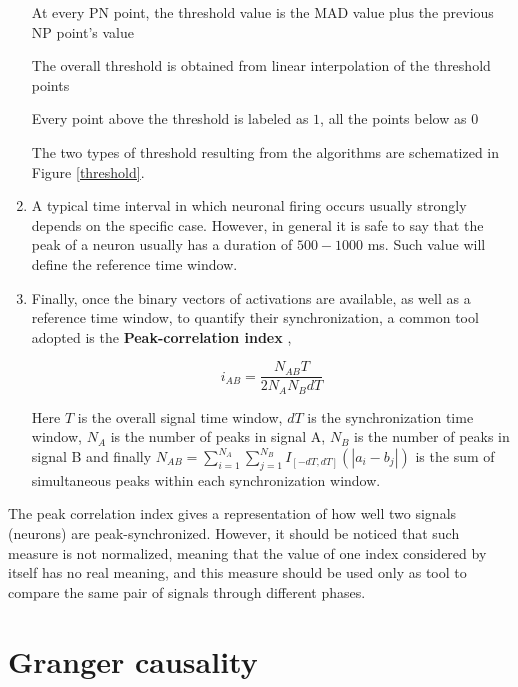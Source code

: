 \documentclass[12pt, a4paper]{report}
\begin{document}
\begin{enumerate}
\begin{algorithm}
\begin{algorithmic}[1]
			
			\State At every PN point, the threshold value is the MAD value plus the previous NP point's value
			
			\State The overall threshold is obtained from linear interpolation of the threshold points
			
			\State Every point above the threshold is labeled as $1$, all the points below as $0$
		\end{algorithmic}
	\end{algorithm}
	
		The two types of threshold resulting from the algorithms are schematized in Figure \ref{threshold}.
	
	
	\item A typical time interval in which neuronal firing occurs usually strongly depends on the specific case. However, in general it is safe to say that the peak of a neuron usually has a duration of $500-1000$ ms. Such value will define the reference time window. 
	
	\item Finally, once the binary vectors of activations are available, as well as a reference time window, to quantify their synchronization, a common tool adopted is the \textbf{Peak-correlation index} \cite{18},%
	
	\begin{equation}
		i_{AB} = \frac{N_{AB} T}{2 N_A N_B dT} \label{peak index}
	\end{equation}
	 
	Here $T $ is the overall signal time window, $dT$ is the synchronization time window, $N_A$ is the number of peaks in signal A, $N_B $ is the number of peaks in signal B and finally $N_{AB} = \sum_{i=1}^{N_A} \sum_{j=1}^{N_B} I_{[-dT,dT]}(|a_i - b_j|) $ is the sum of simultaneous peaks within each synchronization window.
	
\end{enumerate}

The peak correlation index gives a representation of how well two signals (neurons) are peak-synchronized. However, it should be noticed that such measure is not normalized, meaning that the value of one index considered by itself has no real meaning, and this measure should be used only as tool to compare the same pair of signals through different phases.





\section{Granger causality}
\end{document}
